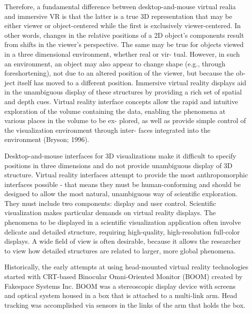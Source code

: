 Therefore, a fundamental difference between desktop-and-mouse virtual realia and immersive VR is that the latter is a true 3D representation that may be either viewer or object-centered while the first is exclusively viewer-centered. In other words, changes in the relative positions of a 2D object’s components result from shifts in the viewer’s perspective. The same may be true for objects viewed in a three dimensional environment, whether real or vir- tual. However, in such an environment, an object may also appear to change shape (e.g., through foreshortening), not due to an altered position of the viewer, but because the ob- ject itself has moved to a different position. Immersive virtual reality displays aid in the unambiguous display of these structures by providing a rich set of spatial and depth cues. Virtual reality interface concepts allow the rapid and intuitive exploration of the volume containing the data, enabling the phenomena at various places in the volume to be ex- plored, as well as provide simple control of the visualization environment through inter- faces integrated into the environment (Bryson; 1996).

Desktop-and-mouse interfaces for 3D visualizations make it difficult to specify positions in three dimensions and do not provide unambiguous display of 3D structure. Virtual reality interfaces attempt to provide the most anthropomorphic interfaces possible - that means they must be human-conforming and should be designed to allow the most natural, unambiguous way of scientific exploration. They must include two components: display and user control. Scientific visualization makes particular demands on virtual reality displays. The phenomena to be displayed in a scientific visualization application often involve delicate and detailed structure, requiring high-quality, high-resolution full-color displays. A wide field of view is often desirable, because it allows the researcher to view how detailed structures are related to larger, more global phenomena.

Historically, the early attempts at using head-mounted virtual reality technologies started with CRT-based Binocular Omni-Oriented Monitor (BOOM) created by Fakespace Systems Inc. BOOM was a stereoscopic display device with screens and optical system housed in a box that is attached to a multi-link arm. Head tracking was accomplished via sensors in the links of the arm that holds the box.

